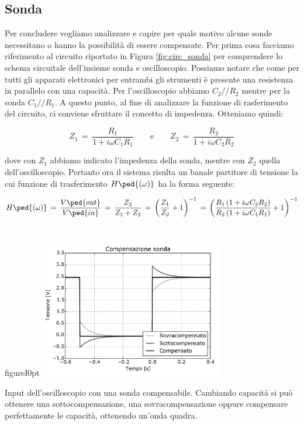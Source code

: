 \subsection*{Sonda}

Per concludere vogliamo analizzare e capire per quale motivo alcune sonde necessitano o hanno la possibilità di essere compensate. Per prima cosa facciamo riferimento al circuito riportato in Figura \ref{fig:circ_sonda} per comprendere lo schema circuitale dell'insieme sonda e oscilloscopio. Possiamo notare che come per tutti gli apparati elettronici per entrambi gli strumenti è presente una resistenza in parallelo con una capacità. Per l'oscilloscopio abbiamo $C_2//R_2$ mentre per la sonda $C_1//R_1$. A questo punto, al fine di analizzare la funzione di rasferimento del circuito, ci conviene sfruttare il concetto di impedenza. Otteniamo quindi:

\begin{equation}
	Z_1\,=\,\frac{R_1}{1 + i \omega C_1 R_1} \qquad \text{e} \qquad Z_2\,=\,\frac{R_2}{1 + i \omega C_2 R_2}
\end{equation}

dove con $Z_1$ abbiamo indicato l'impedenza della sonda, mentre con $Z_2$ quella dell'oscilloscopio. Pertanto ora il sistema risulta un banale partitore di tensione la cui funzione di trasferimento $H\ped{(\omega)}$ ha la forma seguente:

\begin{equation}
	H\ped{(\omega)}\,=\,\frac{V\ped{out}}{V\ped{in}}\,=\,\frac{Z_2}{Z_1+Z_2}\,=\,\left(\frac{Z_1}{Z_2} +1\right)^{-1}\,=\,\left(\frac{R_1\,(1 + i \omega C_2 R_2)}{R_2\,(1 + i \omega C_1 R_1)} +1 \right)^{-1}
\end{equation}
\\

\begin{wrapfloat}{figure}{I}{0pt}
	\includegraphics[width=0.6\textwidth]{figure/comp.pdf}
	\caption{Input dell'oscilloscopio con una sonda compensabile. Cambiando capacità si può ottenere una sottocompensazione, una sovracompensazione oppure compensare perfettamente le capacità, ottenendo un'onda quadra.}
	\label{fig:compensazione}
\end{wrapfloat}

